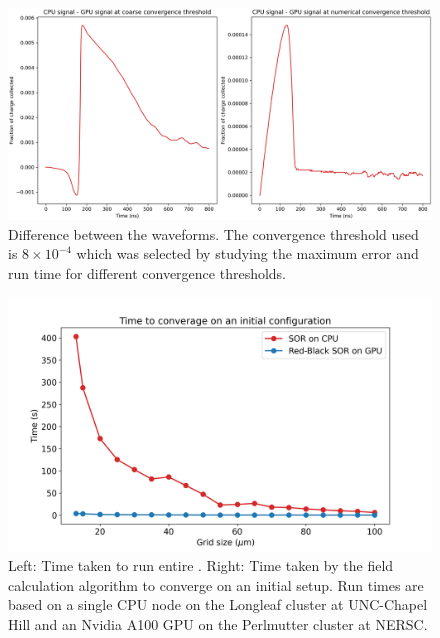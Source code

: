 \begin{figure}[!ht]
\centering
 \includegraphics[width=0.99\linewidth]{ch4/figs/converge_threshold_dif.png}
\caption{Difference between the waveforms. The convergence threshold used is $8\times10^{-4}$ which was selected by studying the maximum error and run time for different convergence thresholds.}
\label{fig:cov_thres_diff} 
\end{figure}


\begin{figure}[!ht]
\centering
 \includegraphics[width=0.99\linewidth]{ch4/figs/sor_cpu_gpu_comp.png}
\caption{\label{fig:sor_run_time} Left: Time taken to run entire {\tdsim}. Right: Time taken by the field calculation algorithm to converge on an initial setup. Run times are based on a single CPU node on the Longleaf cluster at UNC-Chapel Hill and an Nvidia A100 GPU on the Perlmutter cluster at NERSC.}
\end{figure}


